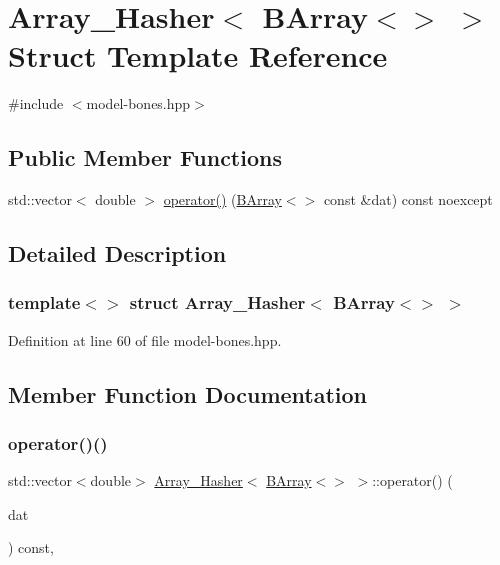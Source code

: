 \hypertarget{struct_array___hasher_3_01_b_array_3_4_01_4}{}\section{Array\+\_\+\+Hasher$<$ B\+Array$<$$>$ $>$ Struct Template Reference}
\label{struct_array___hasher_3_01_b_array_3_4_01_4}


{\ttfamily \#include $<$model-\/bones.\+hpp$>$}

\subsection*{Public Member Functions}
\begin{DoxyCompactItemize}
\item 
std\+::vector$<$ double $>$ \hyperlink{struct_array___hasher_3_01_b_array_3_4_01_4_a5a40ad373242142e6e8ca77611fb1be3}{operator()} (\hyperlink{class_b_array}{B\+Array}$<$$>$ const \&dat) const noexcept
\end{DoxyCompactItemize}


\subsection{Detailed Description}
\subsubsection*{template$<$$>$\newline
struct Array\+\_\+\+Hasher$<$ B\+Array$<$$>$ $>$}



Definition at line 60 of file model-\/bones.\+hpp.



\subsection{Member Function Documentation}
\mbox{\label{struct_array___hasher_3_01_b_array_3_4_01_4_a5a40ad373242142e6e8ca77611fb1be3}} 
\subsubsection{\texorpdfstring{operator()()}{operator()()}}
{\footnotesize\ttfamily std\+::vector$<$double$>$ \hyperlink{struct_array___hasher}{Array\+\_\+\+Hasher}$<$ \hyperlink{class_b_array}{B\+Array}$<$$>$ $>$\+::operator() (\begin{DoxyParamCaption}\item[{\hyperlink{class_b_array}{B\+Array}$<$$>$ const \&}]{dat }\end{DoxyParamCaption}) const\hspace{0.3cm}{\ttfamily [inline]}, {\ttfamily [noexcept]}}



